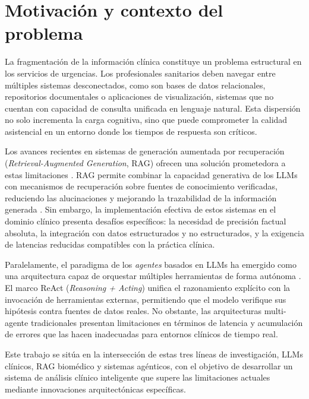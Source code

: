 \section{Motivación y contexto del problema}
\label{sec:motivacion}

La fragmentación de la información clínica constituye un problema estructural en los servicios de urgencias. Los profesionales sanitarios deben navegar entre múltiples sistemas desconectados, como son bases de datos relacionales, repositorios documentales o aplicaciones de visualización, sistemas que no cuentan con capacidad de consulta unificada en lenguaje natural. Esta dispersión no solo incrementa la carga cognitiva, sino que puede comprometer la calidad asistencial en un entorno donde los tiempos de respuesta son críticos.

Los avances recientes en sistemas de generación aumentada por recuperación (\textit{Retrieval-Augmented Generation}, \acs{RAG}) ofrecen una solución prometedora a estas limitaciones \parencite{lewis2020rag}. \ac{RAG} permite combinar la capacidad generativa de los \ac{LLM}s con mecanismos de recuperación sobre fuentes de conocimiento verificadas, reduciendo las alucinaciones y mejorando la trazabilidad de la información generada \parencite{xiong2024medrag}. Sin embargo, la implementación efectiva de estos sistemas en el dominio clínico presenta desafíos específicos: la necesidad de precisión factual absoluta, la integración con datos estructurados y no estructurados, y la exigencia de latencias reducidas compatibles con la práctica clínica.

Paralelamente, el paradigma de los \emph{agentes} basados en \ac{LLM}s ha emergido como una arquitectura capaz de orquestar múltiples herramientas de forma autónoma \parencite{Wang2024SurveyAgents,Plaat2025AgenticSurvey}. El marco \acs{ReAct} (\emph{Reasoning + Acting}) \parencite{Yao2023ReAct} unifica el razonamiento explícito con la invocación de herramientas externas, permitiendo que el modelo verifique sus hipótesis contra fuentes de datos reales. No obstante, las arquitecturas multi-agente tradicionales presentan limitaciones en términos de latencia y acumulación de errores que las hacen inadecuadas para entornos clínicos de tiempo real.

Este trabajo se sitúa en la intersección de estas tres líneas de investigación, \ac{LLM}s clínicos, \ac{RAG} biomédico y sistemas agénticos, con el objetivo de desarrollar un sistema de análisis clínico inteligente que supere las limitaciones actuales mediante innovaciones arquitectónicas específicas.

